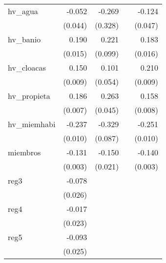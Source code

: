 {\begin{longtable}{l*{4}{D{.}{.}{-1}}}
\addlinespace
hv\_agua     &      -0.052         &      -0.269         &                     &      -0.124\sym{**} \\
            &     (0.044)         &     (0.328)         &                     &     (0.047)         \\
\addlinespace
hv\_banio    &       0.190\sym{***}&       0.221\sym{*}  &                     &       0.183\sym{***}\\
            &     (0.015)         &     (0.099)         &                     &     (0.016)         \\
\addlinespace
hv\_cloacas  &       0.150\sym{***}&       0.101         &                     &       0.210\sym{***}\\
            &     (0.009)         &     (0.054)         &                     &     (0.009)         \\
\addlinespace
hv\_propieta &       0.186\sym{***}&       0.263\sym{***}&                     &       0.158\sym{***}\\
            &     (0.007)         &     (0.045)         &                     &     (0.008)         \\
\addlinespace
hv\_miemhabi &      -0.237\sym{***}&      -0.329\sym{***}&                     &      -0.251\sym{***}\\
            &     (0.010)         &     (0.087)         &                     &     (0.010)         \\
\addlinespace
miembros    &      -0.131\sym{***}&      -0.150\sym{***}&                     &      -0.140\sym{***}\\
            &     (0.003)         &     (0.021)         &                     &     (0.003)         \\
\addlinespace
reg3        &      -0.078\sym{**} &                     &                     &                     \\
            &     (0.026)         &                     &                     &                     \\
\addlinespace
reg4        &      -0.017         &                     &                     &                     \\
            &     (0.023)         &                     &                     &                     \\
\addlinespace
reg5        &      -0.093\sym{***}&                     &                     &                     \\
            &     (0.025)         &                     &                     &                     \\

\end{longtable}}
